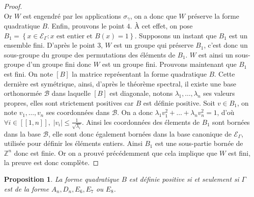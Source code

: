 \documentclass[a4paper,10pt]{article}
\newtheorem{prop}[thm]{Proposition}%
\newcommand{\EG}{\mathscr{E}_\Gamma}
\newcommand{\ent}[2]{[\![#1,#2]\!]}
\begin{document}
\begin{proof}
\[			\]
			Or $W$ est engendré par les applications $\sigma_\gamma$, on a donc que $W$ préserve la forme quadratique $B$. Enfin, prouvons le point $4$. À cet effet, on pose $B_1=\left\{ x\in\EG : x\text{ est entier et }B(x)=1 \right\}$. Supposons un instant que $B_1$ est un ensemble fini. D'après le point $3$, $W$ est un groupe qui préserve $B_1$, c'est donc un sous-groupe du groupe des permutations des éléments de $B_1$. $W$ est ainsi un sous-groupe d'un groupe fini donc $W$ est un groupe fini. Prouvons maintenant que $B_1$ est fini. On note $\left[ B \right]$ la matrice représentant la forme quadratique $B$. Cette dernière est symétrique, ainsi, d'après le théorème spectral, il existe une base orthonormée $\mathscr B$ dans laquelle $\left[ B \right]$ est diagonale, notons $\lambda_1,\dots,\lambda_n$ ses valeurs propres, elles sont strictement positives car $B$ est définie positive. Soit $v\in B_1$, on note $v_1,\dots,v_n$ ses coordonnées dans $\mathscr B$. On a donc $\lambda_1v_1^2+\dots+\lambda_nv_n^2=1$, d'où $\forall i \in\ent{1}{n},\;|v_i|\leq\frac{1}{\sqrt{\lambda_i}}$. Ainsi les coordonnées des élements de $B_1$ sont bornées dans la base $\mathscr B$, elle sont donc également bornées dans la base canonique de $\EG$, utilisée pour définir les éléments entiers. Ainsi $B_1$ est une sous-partie bornée de $\mathbb Z^n$ donc est finie. Or on a prouvé précédemment que cela implique que $W$ est fini, la preuve est donc complète.
		\end{proof}
		\begin{prop}
		La forme quadratique $B$ est définie positive si et seulement si $\Gamma$ est de la forme $A_n,D_n,E_6,E_7$ ou $E_8$.
		\end{prop}
\end{document}
